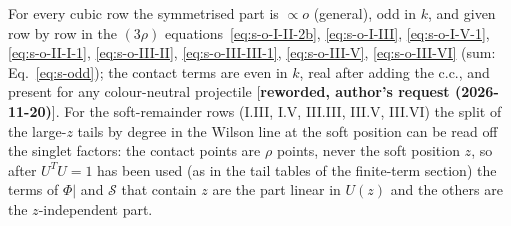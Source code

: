 \documentclass[9pt]{article}
\numberwithin{equation}{section}
\begin{document}
{\begin{center}
\begin{tabular}{|l|l|l|l|}
\end{tabular}
\end{center}
For every cubic row the symmetrised part is $\propto o$ (general), odd in $k$, and given row by row in the $(3\rho)$ equations~\eqref{eq:s-o-I-II-2b}, \eqref{eq:s-o-I-III}, \eqref{eq:s-o-I-V-1}, \eqref{eq:s-o-II-I-1}, \eqref{eq:s-o-III-II}, \eqref{eq:s-o-III-III-1}, \eqref{eq:s-o-III-V}, \eqref{eq:s-o-III-VI} (sum: Eq.~\eqref{eq:s-odd}); the contact terms are even in $k$, real after adding the c.c., and present for any colour-neutral projectile [\textbf{reworded, author's request (2026-11-20)}]. For the soft-remainder rows (I.III, I.V, III.III, III.V, III.VI) the split of the large-$z$ tails by degree in the Wilson line at the soft position can be read off the singlet factors: the contact points are $\rho$ points, never the soft position $z$, so after $U^{T}U=1$ has been used (as in the tail tables of the finite-term section) the terms of $\Phi|$ and $\mathcal{S}$ that contain $z$ are the part linear in $U(z)$ and the others are the $z$-independent part.

}
\end{document}
